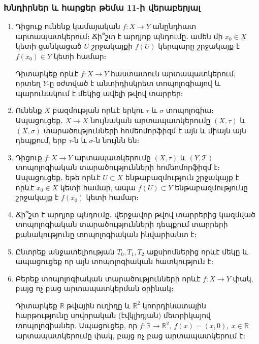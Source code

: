 \bigskip
\bigskip
\subsubsection*{Խնդիրներ և հարցեր թեմա 11-ի վերաբերյալ}

\begin{enumerate}[label=\thesection.\arabic*.]

\item Դիցուք ունենք կամայական $f: X \to Y$ անընդհատ արտապատկերում։ Ճի՞շտ է արդյոք պնդումը․ ամեն մի $x_0 \in X$ կետի ցանկացած $U$ շրջակայքի $f(U)$ կերպարը շրջակայք է $f(x_0) \in Y$ կետի համար։

\begin{hint}
Դիտարկեք որևէ $f: X \to Y$ հաստատուն արտապատկերում, որտեղ $Y$-ը օժտված է անտիդիսկրետ տոպոլոգիայով և պարունակում է մեկից ավելի թվով տարրեր։
\end{hint}

\item Ունենք $X$ բազմության որևէ երկու $\tau$ և $\sigma$ տոպոլոգիա։ Ապացուցեք․ $X \to X$ նույնական արտապատկերումը $(X, \tau)$ և $(X, \sigma)$ տարածությունների հոմեոմորֆիզմ է այն և միայն այն դեպքում, երբ $\tau$-ն և $\sigma$-ն նույնն են։

\item Դիցուք $f: X \to Y$ արտապատկերումը $(X, \tau)$ և $(Y, \mathcal{T})$ տոպոլոգիական տարածությունների հոմեոմորֆիզմ է։ Ապացուցեք․ եթե որևէ $U \subset X$ ենթաբազմություն շրջակայք է որևէ $x_0 \in X$ կետի համար, ապա $f(U) \subset Y$ ենթաբազմությունը շրջակայք է $f(x_0)$ կետի համար։

\item Ճի՞շտ է արդյոք պնդումը․ վերջավոր թվով տարրերից կազմված տոպոլոգիական տարածությունների դեպքում տարրերի քանակությունը տոպոլոգիական ինվարիանտ է։

\item Ընտրեք անջատելիության $T_0, T_1, T_2$ աքսիոմներից որևէ մեկը և ապացուցեք որ այն տոպոլոգիական հատկություն է։

\item Բերեք տոպոլոգիական տարածությունների որևէ $f: X \to Y$ փակ, բայց ոչ բաց արտապատկերման օրինակ։

\begin{hint}
Դիտարկեք $\mathbb{R}$ թվային ուղիղը և $\mathbb{R}^2$ կոորդինատային հարթությունը սովորական (էվկլիդյան) մետրիկայով տոպոլոգիաներ. Ապացուցեք, որ $f: \mathbb{R} \to \mathbb{R}^2, \ f(x)=(x, 0), \ x \in \mathbb{R}$ արտապատկերումը փակ, բայց ոչ բաց արտապատկերում է։
\end{hint}


\end{enumerate}
